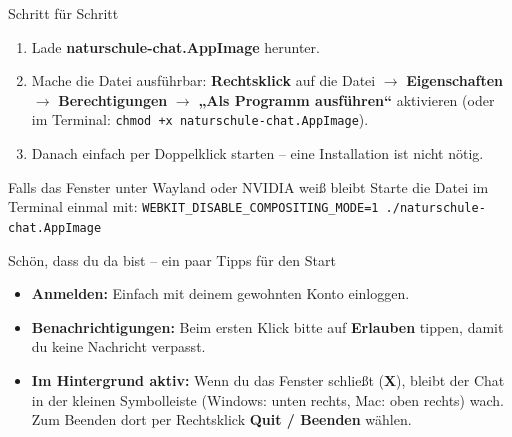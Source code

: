 \documentclass{lernblatt}
\begin{document}

\begin{aufg}{Schritt für Schritt}
\begin{enumerate}
  \item Lade \textbf{naturschule-chat.AppImage} herunter.
  \item Mache die Datei ausführbar: \textbf{Rechtsklick} auf die Datei $\rightarrow$ \textbf{Eigenschaften} $\rightarrow$ \textbf{Berechtigungen} $\rightarrow$ \textbf{„Als Programm ausführen“} aktivieren (oder im Terminal: \texttt{chmod +x naturschule-chat.AppImage}).
  \item Danach einfach per Doppelklick starten -- eine Installation ist nicht nötig.
\end{enumerate}
\end{aufg}

\begin{tipp}{Falls das Fenster unter Wayland oder NVIDIA weiß bleibt}
Starte die Datei im Terminal einmal mit: \texttt{WEBKIT\_DISABLE\_COMPOSITING\_MODE=1 ./naturschule-chat.AppImage}
\end{tipp}

\begin{merke}{Schön, dass du da bist -- ein paar Tipps für den Start}
\begin{itemize}
  \item \textbf{Anmelden:} Einfach mit deinem gewohnten Konto einloggen.
  \item \textbf{Benachrichtigungen:} Beim ersten Klick bitte auf \textbf{Erlauben} tippen, damit du keine Nachricht verpasst.
  \item \textbf{Im Hintergrund aktiv:} Wenn du das Fenster schließt (\textbf{X}), bleibt der Chat in der kleinen Symbolleiste (Windows: unten rechts, Mac: oben rechts) wach. Zum Beenden dort per Rechtsklick \textbf{Quit / Beenden} wählen.
\end{itemize}
\end{merke}
\end{document}
